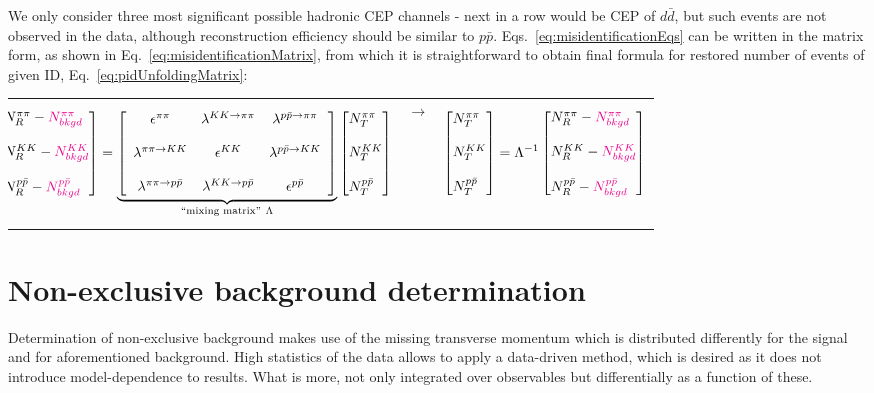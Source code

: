 We only consider three most significant possible hadronic CEP channels - next in a row would be CEP of $d\bar{d}$, but such events are not observed in the data, although reconstruction efficiency should be similar to $p\bar{p}$. Eqs.~\eqref{eq:misidentificationEqs} can be written in the matrix form, as shown in Eq.~\eqref{eq:misidentificationMatrix}, from which it is straightforward to obtain final formula for restored number of events of given ID, Eq.~\eqref{eq:pidUnfoldingMatrix}:

\begin{tabulary}{\textwidth}{LCL}
\begin{equation}\label{eq:misidentificationMatrix}\hspace*{-15pt}
\Spvek{N^{\pi\pi}_{R}-\textcolor{magenta}{N^{\pi\pi}_{bkgd}};~;N^{KK}_{R}-\textcolor{magenta}{N^{KK}_{bkgd}};~;N^{p\bar{p}}_{R}-\textcolor{magenta}{N^{p\bar{p}}_{bkgd}}} =  \underbrace{\left[ \begin{array}{ccc}
\epsilon^{\pi\pi} & \lambda^{ KK\rightarrow \pi\pi} & \lambda^{p\bar{p} \rightarrow \pi\pi} \\
~ & ~ & ~\\
\lambda^{\pi\pi\rightarrow KK} & \epsilon^{KK} & \lambda^{ p\bar{p} \rightarrow KK}\\
~ & ~ & ~\\
\lambda^{\pi\pi\rightarrow p\bar{p}} & \lambda^{ KK\rightarrow p\bar{p}} & \epsilon^{p\bar{p}}
\end{array} \right]}_{\text{``mixing matrix''}~\Lambda}\Spvek{N^{\pi\pi}_{T};~;N^{KK}_{T};~;N^{p\bar{p}}_{T}}
\end{equation}&%
\vspace{40pt}$\rightarrow$\hspace{20pt}&
\begin{equation}\label{eq:pidUnfoldingMatrix}
\Spvek{N^{\pi\pi}_{T};~;N^{KK}_{T};~;N^{p\bar{p}}_{T}} = \Lambda^{-1}\Spvek{N^{\pi\pi}_{R}-\textcolor{magenta}{N^{\pi\pi}_{bkgd}};~;N^{KK}_{R}-\textcolor{magenta}{N^{KK}_{bkgd}};~;N^{p\bar{p}}_{R}-\textcolor{magenta}{N^{p\bar{p}}_{bkgd}}}
\end{equation}
\end{tabulary}

\section{Non-exclusive background determination}\label{sec:nonExclBkgdDetermination}

Determination of non-exclusive background makes use of the missing transverse momentum which is distributed differently for the signal and for aforementioned background. High statistics of the data allows to apply a data-driven method, which is desired as it does not introduce model-dependence to results. What is more, not only integrated over observables but differentially as a function of these.

